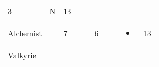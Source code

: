 \documentclass[12pt]{article}
\newcommand{\indexClass}[1]{\index{#1}}
\newcommand{\class}[1]{#1\indexClass{#1}}
\begin{document}
\begin{longtable}[]{@{}llllllllll@{}}
\begin{minipage}[t]{0.06\columnwidth}
3
\strut\end{minipage} &
\begin{minipage}[t]{0.07\columnwidth}\raggedright\strut
N
\strut\end{minipage} &
\begin{minipage}[t]{0.08\columnwidth}\raggedright\strut
13
\strut\end{minipage}\tabularnewline
\begin{minipage}[t]{0.13\columnwidth}\raggedright\strut
\class{Alchemist}
\strut\end{minipage} &
\begin{minipage}[t]{0.06\columnwidth}\raggedright\strut
\strut\end{minipage} &
\begin{minipage}[t]{0.06\columnwidth}\raggedright\strut
7
\strut\end{minipage} &
\begin{minipage}[t]{0.06\columnwidth}\raggedright\strut
\strut\end{minipage} &
\begin{minipage}[t]{0.06\columnwidth}\raggedright\strut
\strut\end{minipage} &
\begin{minipage}[t]{0.06\columnwidth}\raggedright\strut
6
\strut\end{minipage} &
\begin{minipage}[t]{0.06\columnwidth}\raggedright\strut
\strut\end{minipage} &
\begin{minipage}[t]{0.06\columnwidth}\raggedright\strut
\strut\end{minipage} &
\begin{minipage}[t]{0.07\columnwidth}\raggedright\strut
\begin{itemize}
\item
\end{itemize}
\strut\end{minipage} &
\begin{minipage}[t]{0.08\columnwidth}\raggedright\strut
13
\strut\end{minipage}\tabularnewline
\begin{minipage}[t]{0.13\columnwidth}\raggedright\strut
\class{Valkyrie}
\strut\end{minipage} &
\begin{minipage}[t]{0.06\columnwidth}\raggedright\strut
\strut\end{minipage} &
\begin{minipage}[t]{0.06\columnwidth}\raggedright\strut

\end{minipage}
\end{longtable}
\end{document}
